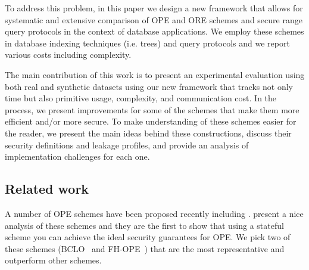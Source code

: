 	To address this problem, in this paper we design a new framework that allows for systematic and extensive comparison of OPE and ORE schemes and secure range query protocols in the context of database applications.
	We employ these schemes in database indexing techniques (i.e. {\BPlus} trees) and query protocols and we report various costs including {\IO} complexity.

	The main contribution of this work is to present an experimental evaluation using both real and synthetic datasets using our new framework that tracks not only time but also primitive usage, {\IO} complexity, and communication cost.
	In the process, we present improvements for some of the schemes that make them more efficient and/or more secure.
	To make understanding of these schemes easier for the reader, we present the main ideas behind these constructions, discuss their security definitions and leakage profiles, and provide an analysis of implementation challenges for each one.

	\subsection{Related work}

		A number of OPE schemes have been proposed recently including \cite{ope-original, anti-tamper-dbs, bclo-ope, ope-leakage, ope-beyond-one-wayness, ope-early-fh-ope, ope-beyond-ideal-object, ope-mv-opes, fh-ope, ope-mv-popes, ope-multi-user, ope-note, ope-for-encrypted-dbs, ope-structure, ope-non-linear}. %
		\textcite{ope-ideal-security-protocol} present a nice analysis of these schemes and they are the first to show that using a stateful scheme you can achieve the ideal security guarantees for OPE\@.
		We pick two of these schemes (BCLO~\cite{bclo-ope} and FH-OPE~\cite{fh-ope}) that are the most representative and outperform other schemes.

